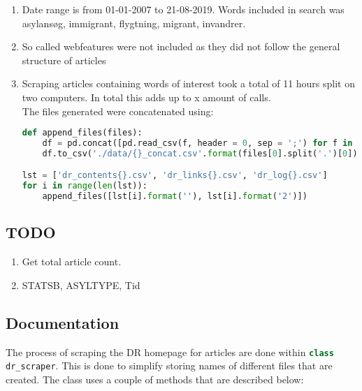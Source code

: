 \documentclass[10pt,a4paper]{article}
\author{Sebastian Baltser}
\begin{document}
	\begin{enumerate}
		\item Date range is from 01-01-2007 to 21-08-2019. Words included in search was asylansøg, immigrant, flygtning, migrant, invandrer.
		\item So called webfeatures were not included as they did not follow the general structure of articles
		\item Scraping articles containing words of interest took a total of 11 hours split on two computers. In total this adds up to x amount of calls.\\
		The files generated were concatenated using:
		
\begin{lstlisting}[language=Python]
def append_files(files):
	df = pd.concat([pd.read_csv(f, header = 0, sep = ';') for f in files], axis = 0)
	df.to_csv('./data/{}_concat.csv'.format(files[0].split('.')[0]), index = False) #Save to csv named as the first file with 'concat' appended

lst = ['dr_contents{}.csv', 'dr_links{}.csv', 'dr_log{}.csv']
for i in range(len(lst)):
	append_files([lst[i].format(''), lst[i].format('2')])
\end{lstlisting}
	\end{enumerate}
	\subsection{TODO}
	\begin{enumerate}
		\item Get total article count.
		\item STATSB, ASYLTYPE, Tid
	\end{enumerate}
	\subsection{Documentation}
		The process of scraping the DR homepage for articles are done within \lstinline[language=Python]|class dr_scraper|. This is done to simplify storing names of different files that are created. The class uses a couple of methods that are described below:
\end{document}
